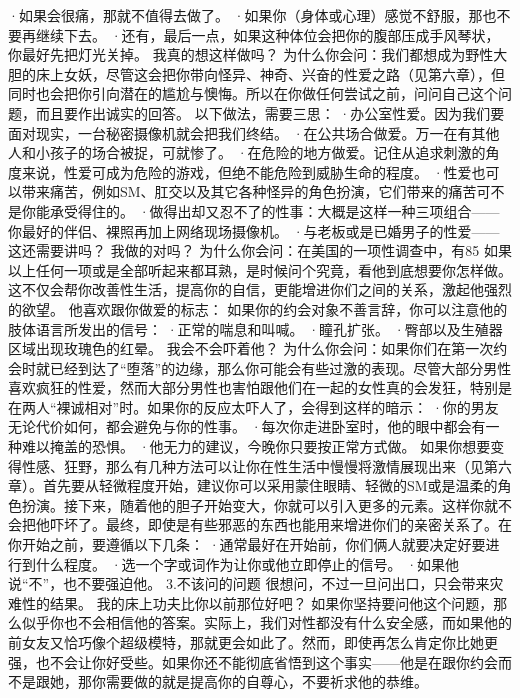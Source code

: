 \documentclass[12pt,UTF8]{ctexbook}
\begin{document}
·如果会很痛，那就不值得去做了。
·如果你（身体或心理）感觉不舒服，那也不要再继续下去。
·还有，最后一点，如果这种体位会把你的腹部压成手风琴状，你最好先把灯光关掉。
我真的想这样做吗？
为什么你会问：我们都想成为野性大胆的床上女妖，尽管这会把你带向怪异、神奇、兴奋的性爱之路（见第六章），但同时也会把你引向潜在的尴尬与懊悔。所以在你做任何尝试之前，问问自己这个问题，而且要作出诚实的回答。
以下做法，需要三思：
·办公室性爱。因为我们要面对现实，一台秘密摄像机就会把我们终结。
·在公共场合做爱。万一在有其他人和小孩子的场合被捉，可就惨了。
·在危险的地方做爱。记住从追求刺激的角度来说，性爱可成为危险的游戏，但绝不能危险到威胁生命的程度。
·性爱也可以带来痛苦，例如SM、肛交以及其它各种怪异的角色扮演，它们带来的痛苦可不是你能承受得住的。
·做得出却又忍不了的性事：大概是这样一种三项组合——你最好的伴侣、裸照再加上网络现场摄像机。
·与老板或是已婚男子的性爱——这还需要讲吗？
我做的对吗？
为什么你会问：在美国的一项性调查中，有85%
如果以上任何一项或是全部听起来都耳熟，是时候问个究竟，看他到底想要你怎样做。这不仅会帮你改善性生活，提高你的自信，更能增进你们之间的关系，激起他强烈的欲望。
他喜欢跟你做爱的标志：
如果你的约会对象不善言辞，你可以注意他的肢体语言所发出的信号：
·正常的喘息和叫喊。
·瞳孔扩张。
·臀部以及生殖器区域出现玫瑰色的红晕。
我会不会吓着他？
为什么你会问：如果你们在第一次约会时就已经到达了“堕落”的边缘，那么你可能会有些过激的表现。尽管大部分男性喜欢疯狂的性爱，然而大部分男性也害怕跟他们在一起的女性真的会发狂，特别是在两人“裸诚相对”时。如果你的反应太吓人了，会得到这样的暗示：
·你的男友无论代价如何，都会避免与你的性事。
·每次你走进卧室时，他的眼中都会有一种难以掩盖的恐惧。
·他无力的建议，今晚你只要按正常方式做。
如果你想要变得性感、狂野，那么有几种方法可以让你在性生活中慢慢将激情展现出来（见第六章）。首先要从轻微程度开始，建议你可以采用蒙住眼睛、轻微的SM或是温柔的角色扮演。接下来，随着他的胆子开始变大，你就可以引入更多的元素。这样你就不会把他吓坏了。最终，即使是有些邪恶的东西也能用来增进你们的亲密关系了。在你开始之前，要遵循以下几条：
·通常最好在开始前，你们俩人就要决定好要进行到什么程度。
·选一个字或词作为让你或他立即停止的信号。
·如果他说“不”，也不要强迫他。
3.不该问的问题
很想问，不过一旦问出口，只会带来灾难性的结果。
我的床上功夫比你以前那位好吧？
如果你坚持要问他这个问题，那么似乎你也不会相信他的答案。实际上，我们对性都没有什么安全感，而如果他的前女友又恰巧像个超级模特，那就更会如此了。然而，即使再怎么肯定你比她更强，也不会让你好受些。如果你还不能彻底省悟到这个事实——他是在跟你约会而不是跟她，那你需要做的就是提高你的自尊心，不要祈求他的恭维。
\end{document}
